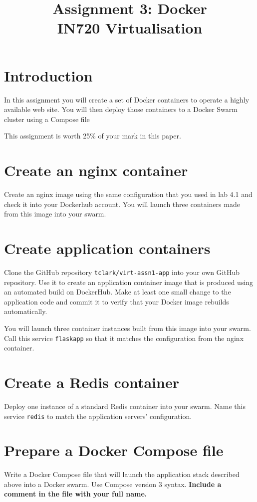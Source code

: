 \documentclass{article}
\begin{document}
\title{Assignment 3: Docker \\ IN720 Virtualisation}
\date{}
\maketitle

\section*{Introduction}
In this assignment you will create a set of Docker containers to operate a highly available web site.  You will then deploy those containers to a Docker Swarm cluster using a Compose file

This assignment is worth 25\% of your mark in this paper.

\section{Create an nginx container}
Create an nginx image using the same configuration that you used in lab 4.1 and check it into your Dockerhub account. You will launch three containers made from this image into your swarm.
 
\section{Create application containers}
Clone the GitHub repository \texttt{tclark/virt-assn1-app} into your own GitHub repository. Use it to create an application container image that is produced using an automated build on DockerHub. Make at least one small change to the application code and commit it to verify that your Docker image rebuilds automatically.

You will launch three container instances built from this image into your swarm. Call this service \texttt{flaskapp} so that it matches the configuration from the nginx container. 

\section{Create a Redis container}
Deploy one instance of a standard Redis container into your swarm. Name this service \texttt{redis} to match the application servers' configuration.

\section{Prepare a Docker Compose file}
Write a Docker Compose file that will launch the application stack described above into a Docker swarm. Use Compose version 3 syntax. \textbf{Include a comment in the file with your full name.}
\end{document}
